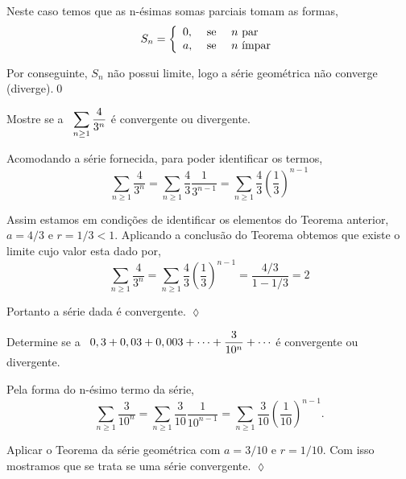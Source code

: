Neste caso temos que as n-\'{e}simas somas parciais tomam as formas,
\begin{equation*}
    S_n=\left\{%
\begin{array}{ll}
    0, & \hbox{ se }\quad n \text{ par }\\
    a, & \hbox{ se }\quad n \text{ \'{\i}mpar}\\
\end{array}%
\right.
\end{equation*}

Por conseguinte, $S_n$ n\~{a}o possui limite, logo a s\'{e}rie geom\'{e}trica
n\~{a}o converge (diverge).\qed

\begin{exer}
Mostre se a \ser\ $\displaystyle{\sum_{n\geq 1}\frac{4}{3^n}}$ \'{e}
convergente ou divergente.
\end{exer}

\solo Acomodando a s\'{e}rie fornecida, para poder identificar os
termos,
\begin{equation*}
\sum_{n\geq 1}\frac{4}{3^n}=\sum_{n\geq
1}\frac{4}{3}\frac{1}{3^{n-1}}=\sum_{n\geq
1}\frac{4}{3}\left(\frac{1}{3}\right)^{n-1}
\end{equation*}

Assim estamos em condi\c{c}\~{o}es de identificar os elementos do Teorema
anterior, $a=4/3$ e $r=1/3<1$. Aplicando a conclus\~{a}o do Teorema
obtemos que existe o limite cujo valor esta dado por,
\begin{equation*}
\sum_{n\geq 1}\frac{4}{3^n} =\sum_{n\geq
1}\frac{4}{3}\left(\frac{1}{3}\right)^{n-1}=\frac{4/3}{1-1/3}=2
\end{equation*}

Portanto a s\'{e}rie dada \'{e} convergente. \hfill \(\lozenge\)

\begin{exer}
Determine se a \ser\
$\displaystyle{0,3+0,03+0,003+\cdots+\frac{3}{10^n}+\cdots}$ \'{e} convergente
ou divergente.
\end{exer}

\solo Pela forma do n-\'{e}simo termo da s\'{e}rie,
\begin{equation*}
    \sum_{n\ge 1}\frac{3}{10^n}=\sum_{n\ge
    1}\frac{3}{10}\frac{1}{10^{n-1}}=\sum_{n\ge
    1}\frac{3}{10}\left(\frac{1}{10}\right)^{n-1}.
\end{equation*}

Aplicar o Teorema da s\'{e}rie geom\'{e}trica com $a=3/10$ e $r=1/10$. Com
isso mostramos que se trata se uma s\'{e}rie convergente. \hfill
\(\lozenge\)

